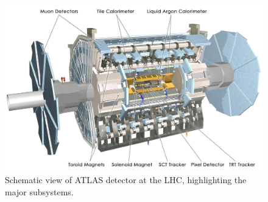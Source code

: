 \begin{figure}[!htb]
\begin{center}
\includegraphics[height=0.49\textwidth]{introduction_figs/0803012_05-A4-at-144-dpi.jpg}
\caption[]{Schematic view of ATLAS detector at the LHC, highlighting the major subsystems.}
\label{fig:pas:intro:atlas}
\end{center}
\end{figure}

